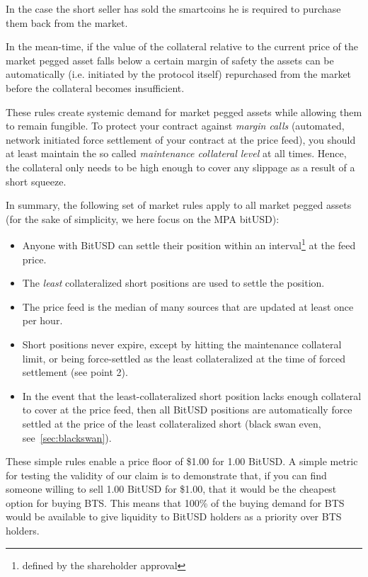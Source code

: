 In the case the short seller has sold the smartcoins he is required to purchase
them back from the market. 

In the mean-time, if the value of the collateral relative to the current price
of the market pegged asset falls below a certain margin of safety the assets
can be automatically (i.e. initiated by the protocol itself) repurchased from
the market before the collateral becomes insufficient.

These rules create systemic demand for market pegged assets while allowing them
to remain fungible. To protect your contract against \emph{margin calls}
(automated, network initiated force settlement of your contract at the price
feed), you should at least maintain the so called \emph{maintenance collateral
level} at all times. Hence, the collateral only needs to be high enough to
cover any slippage as a result of a short squeeze.

In summary, the following set of market rules apply to all market pegged assets
(for the sake of simplicity, we here focus on the MPA bitUSD):
\begin{itemize}
 \item Anyone with BitUSD can settle their position within an
       interval\footnote{defined by the shareholder approval} at the feed
       price.
 \item The \emph{least} collateralized short positions are used to settle the
       position.
 \item The price feed is the median of many sources that are updated at least
       once per hour.
 \item Short positions never expire, except by hitting the maintenance
       collateral limit, or being force-settled as the least collateralized at the
       time of forced settlement (see point 2).
 \item In the event that the least-collateralized short position lacks enough
       collateral to cover at the price feed, then all BitUSD positions are
       automatically force settled at the price of the least collateralized
       short (black swan even, see~\cref{sec:blackswan}).
\end{itemize}

These simple rules enable a price floor of \$1.00 for 1.00 BitUSD. A simple
metric for testing the validity of our claim is to demonstrate that, if you can
find someone willing to sell 1.00 BitUSD for \$1.00, that it would be the
cheapest option for buying BTS. This means that 100\% of the buying demand for
BTS would be available to give liquidity to BitUSD holders as a priority over
BTS holders.
